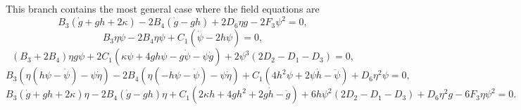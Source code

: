This branch contains the most general case where the field equations are 
\begin{dmath}
    \label{Feq_B1_1}
    B_3\left(\dot{g} + gh + 2\kappa\right) - 2B_4\left(\dot{g} - gh\right) + 2D_6\eta g - 2F_3\psi^2 = 0,
\end{dmath}
\begin{dmath}
    \label{Feq_B1_2}
    B_3\eta\psi -2B_4\eta\psi + C_1\left(\dot{\psi} - 2h\psi\right) = 0,
\end{dmath}
\begin{dmath}
    \label{Feq_B1_3}
    \left(B_3 + 2B_4\right)\eta g\psi + 2C_1\left(\kappa\psi + 4gh\psi - g\dot{\psi} - \psi\dot{g}\right) + 2\psi^3\left(2D_2 - D_1 - D_3\right) = 0,
\end{dmath}
\begin{dmath}
    \label{Feq_B1_4}
    B_3\left(\eta\left(h\psi - \dot{\psi}\right) -\psi\dot{\eta}\right) - 2B_4\left(\eta\left(-h\psi - \dot{\psi}\right) -\psi\dot{\eta}\right) 
    + C_1\left(4h^2\psi + 2\psi\dot{h} -\ddot{\psi}\right) + D_6\eta^2\psi = 0,
\end{dmath}
\begin{dmath}
    \label{Feq_B1_5}
    B_3\left(\dot{g} + gh + 2\kappa\right)\eta - 2B_4\left(\dot{g} - gh\right)\eta + C_1\left(2\kappa h + 4gh^2 + 2g\dot{h} - \ddot{g}\right) +
    6h\psi^2\left(2D_2 - D_1 - D_3\right) + D_6 \eta^2 g - 6F_3\eta\psi^2 = 0.
\end{dmath}

